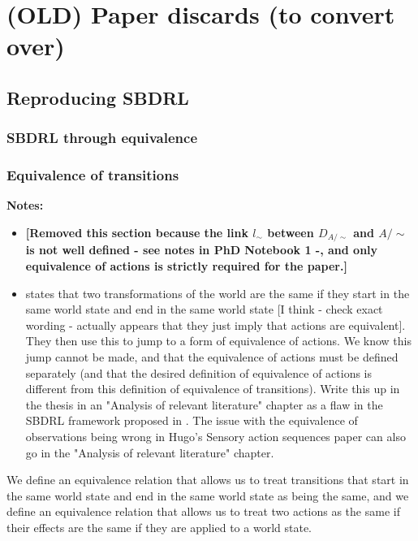 \chapter{(OLD) Paper discards (to convert over)}

\section{Reproducing SBDRL}

\subsection{SBDRL through equivalence}

\subsection{Equivalence of transitions}


\textbf{Notes:}
\begin{itemize}
    \item \textbf{
            [Removed this section because the link $l_{\sim}$ between $D_{A/\sim}$ and $A/\sim$ is not well defined - see notes in PhD Notebook 1 -, and only equivalence of actions is strictly required for the paper.]
            }
    \item \cite{Higgins2018} states that two transformations of the world are the same if they start in the same world state and end in the same world state [I think - check exact wording - actually appears that they just imply that actions are equivalent].
    They then use this to jump to a form of equivalence of actions.
    We know this jump cannot be made, and that the equivalence of actions must be defined separately (and that the desired definition of equivalence of actions is different from this definition of equivalence of transitions).
    Write this up in the thesis in an "Analysis of relevant literature" chapter as a flaw in the SBDRL framework proposed in \cite{Higgins2018}.
    The issue with the equivalence of observations being wrong in Hugo's Sensory action sequences paper can also go in the "Analysis of relevant literature" chapter.
\end{itemize}

We define an equivalence relation that allows us to treat transitions that start in the same world state and end in the same world state as being the same, and we define an equivalence relation that allows us to treat two actions as the same if their effects are the same if they are applied to a world state.

